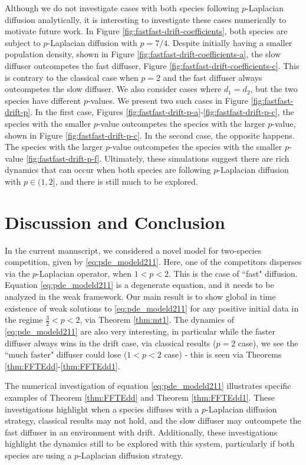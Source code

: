 \documentclass[10pt]{amsart}
\theoremstyle{plain}
\theoremstyle{definition}
\begin{document}
Although we do not investigate cases with both species following $p$-Laplacian diffusion analytically, it is interesting to investigate these cases numerically to motivate future work. In Figure \ref{fig:fastfast-drift-coefficients}, both species are subject to $p$-Laplacian diffusion with $p=7/4$. Despite initially having a smaller population density, shown in Figure \ref{fig:fastfast-drift-coefficients-a}, the slow diffuser outcompetes the fast diffuser, Figure \ref{fig:fastfast-drift-coefficients-c}. This is contrary to the classical case when $p=2$ and the fast diffuser always outcompetes the slow diffuser. We also consider cases where $d_1 = d_2$, but the two species have different $p$-values. We present two such cases in Figure \ref{fig:fastfast-drift-p}. In the first case, Figures \ref{fig:fastfast-drift-p-a}-\ref{fig:fastfast-drift-p-c}, the species with the smaller $p$-value outcompetes the species with the larger $p$-value, shown in Figure \ref{fig:fastfast-drift-p-c}. In the second case, the opposite happens. The species with the larger $p$-value outcompetes the species with the smaller $p$-value \ref{fig:fastfast-drift-p-f}. Ultimately, these simulations suggest there are rich dynamics that can occur when both species are following $p$-Laplacian diffusion with $p \in (1,2]$, and there is still much to be explored.

\section{Discussion and Conclusion}

In the current manuscript, we considered a novel model for two-species competition, given by \eqref{eq:pde_modeld211}. Here, one of the competitors disperses via the $p$-Laplacian operator, when $1 < p < 2$. This is the case of ``fast" diffusion. Equation \eqref{eq:pde_modeld211} is a degenerate equation, and it needs to be analyzed in the weak framework. Our main result is to show global in time existence of weak solutions to \eqref{eq:pde_modeld211} for any positive initial data in the regime $\frac{3}{2} < p < 2$, via Theorem \ref{thm:mt1}. The dynamics of \eqref{eq:pde_modeld211} are also very interesting, in particular while the faster diffuser always wins in the drift case, via classical results ($p=2$ case), we see the ``much faster" diffuser could lose ($1<p<2$ case) - this is seen via Theorems \ref{thm:FFTEdd}-\ref{thm:FFTEdd1}.

The numerical investigation of equation \eqref{eq:pde_modeld211} illustrates specific examples of Theorem \ref{thm:FFTEdd} and Theorem \ref{thm:FFTEdd1}. These investigations highlight when a species diffuses with a $p$-Laplacian diffusion strategy, classical results may not hold, and the slow diffuser may outcompete the fast diffuser in an environment with drift. Additionally, these investigations highlight the dynamics still to be explored with this system, particularly if both species are using a $p$-Laplacian diffusion strategy.  
\end{document}
